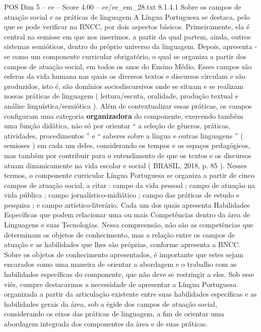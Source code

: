 \begin{textsample}{POS Dim 5 – ce – Score 4.00 – ce/ce\_em\_28.txt}  \label{ex:f5_pos_256}
8.1.4.1 Sobre os campos de atuação social e as práticas de linguagem A Língua Portuguesa se destaca, pelo que se pode verificar na BNCC, por dois aspectos básicos.
Primeiramente, ela é central na semiose em que nos inserimos, a partir da qual partem, ainda, outros sistemas semióticos, dentro do próprio universo da linguagem.
Depois, apresenta -se como um componente curricular obrigatório, o qual se organiza a partir dos campos de atuação social, em todos os anos do Ensino Médio.
Esses campos são esferas da vida humana nas quais os diversos textos e discursos circulam e são produzidos, isto é, são domínios sociodiscursivos onde se situam e se realizam nossas práticas de linguagem ( leitura/escuta, oralidade, produção textual e análise linguística/semiótica ).
Além de contextualizar essas práticas, os campos configuram uma categoria \textbf{organizadora} do componente, exercendo também uma função didática, não só por orientar “ a seleção de gêneros, práticas, atividades, procedimentos ” e “ saberes sobre a língua e outras linguagens ” ( semioses ) em cada um deles, considerando os tempos e os espaços pedagógicos, mas também por contribuir para o entendimento de que os textos e os discursos atuam dinamicamente na vida escolar e social ( BRASIL, 2018, p. 85 ).
Nesses termos, o componente curricular Língua Portuguesa se organiza a partir de cinco campos de atuação social, a citar : campo da vida pessoal ; campo de atuação na vida pública ; campo jornalístico-midiático ; campo das práticas de estudo e pesquisa ; e campo artístico-literário.
Cada um dos quais apresenta Habilidades Específicas que podem relacionar uma ou mais Competências dentro da área de Linguagens e suas Tecnologias.
Nessa compreensão, não são as competências que determinam os objetos de conhecimento, mas a relação entre os campos de atuação e as habilidades que lhes são próprias, conforme apresenta a BNCC.
Sobre os objetos de conhecimento apresentados, é importante que estes sejam encarados como uma maneira de orientar a abordagem e o trabalho com as habilidades específicas do componente, que não deve se restringir a eles.
Sob esse viés, cumpre destacarmos a necessidade de apresentar a Língua Portuguesa organizada a partir da articulação existente entre suas habilidades específicas e as habilidades gerais da área, sob a égide dos campos de atuação social, considerando os eixos das práticas de linguagem, a fim de orientar uma abordagem integrada dos componentes da área e de suas práticas.

\end{textsample}
